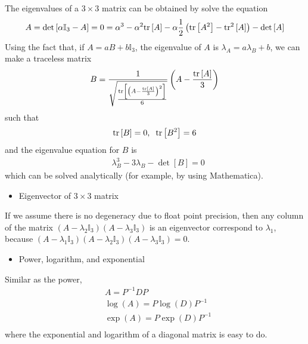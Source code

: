 The eigenvalues of a $3\times 3$ matrix can be obtained by solve the equation
\begin{equation}
\begin{split}
&A=\det \left[\alpha \mathbb{I}_3- A\right]=0=\alpha ^3-\alpha ^2 {\rm tr}\left[A\right]-\alpha \frac{1}{2}\left({\rm tr}\left[A^2\right]-{\rm tr}^2\left[A\right]\right)-\det \left[A\right]\\
\end{split}
\end{equation}
Using the fact that, if $A=a B +b\mathbb{I}_3$, the eigenvalue of $A$ is $\lambda _A = a \lambda _B+b$, we can make a traceless matrix
\begin{equation}
\begin{split}
&B=\frac{1}{\sqrt{\frac{{\rm tr}\left[\left(A-\frac{{\rm tr}\left[A\right]}{3}\right)^2\right]}{6}}}\left(A-\frac{{\rm tr}\left[A\right]}{3}\right)\\
\end{split}
\end{equation}
such that
\begin{equation}
\begin{split}
&{\rm tr}\left[B\right]=0,\;\;{\rm tr}\left[B^2\right]=6\\
\end{split}
\end{equation}
and the eigenvalue equation for $B$ is
\begin{equation}
\begin{split}
&\lambda _B^3-3\lambda _B -\det \left[B\right]=0
\end{split}
\end{equation}
which can be solved analytically (for example, by using Mathematica).


\begin{itemize}
  \item Eigenvector of $3\times 3$ matrix
\end{itemize}

If we assume there is no degeneracy due to float point precision, then any column of the matrix $\left(A-\lambda _2 \mathbb{I}_3\right)\left(A-\lambda _3 \mathbb{I}_3\right)$ is an eigenvector correspond to $\lambda _1$, because $\left(A-\lambda _1 \mathbb{I}_3\right)\left(A-\lambda _2 \mathbb{I}_3\right)\left(A-\lambda _3 \mathbb{I}_3\right)=0$.

\begin{itemize}
  \item Power, logarithm, and exponential
\end{itemize}

Similar as the power,
\begin{equation}
\begin{split}
&A=P^{-1}DP\\
&\log (A)=P\log (D)P^{-1}\\
&\exp (A)=P\exp (D)P^{-1}\\
\end{split}
\end{equation}
where the exponential and logarithm of a diagonal matrix is easy to do. 